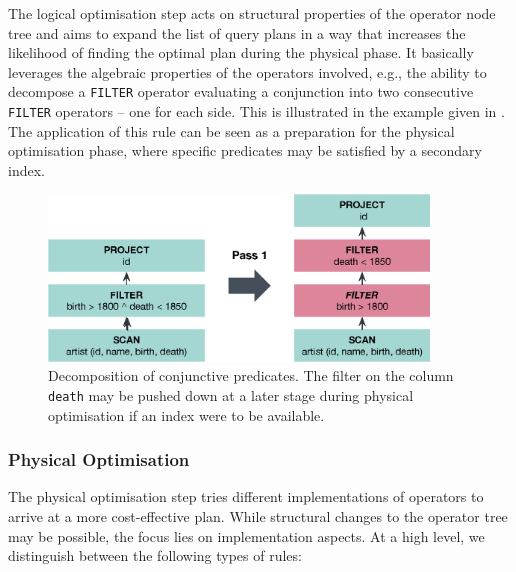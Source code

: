The logical optimisation step acts on structural properties of the operator node tree and aims to expand the list of query plans in a way that increases the likelihood of finding the optimal plan during the physical phase. It basically leverages the algebraic properties of the operators involved, e.g., the ability to decompose a  \texttt{FILTER} operator evaluating a conjunction into two consecutive \texttt{FILTER} operators -- one for each side. This is illustrated in the example given in . The application of this rule can be seen as a preparation for the physical optimisation phase, where specific predicates may be satisfied by a secondary index.

\begin{figure}[bt]
    \centering
    \includegraphics[width=0.9\textwidth]{figures/logical-rule-conjunction}
    \caption{Decomposition of conjunctive predicates. The filter on the column \texttt{death} may be pushed down at a later stage during physical optimisation if an index were to be available.}
    \label{figure:cottontail_logical_rule_conjunction}
\end{figure}

\subsubsection{Physical Optimisation}

The physical optimisation step tries different implementations of operators to arrive at a more cost-effective plan. While structural changes to the operator tree may be possible, the focus lies on implementation aspects.  At a high level, we distinguish between the following types of rules:

